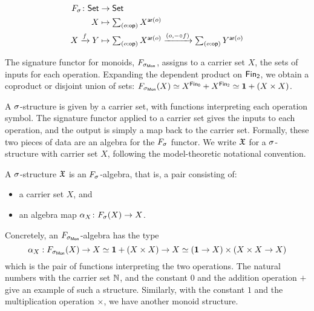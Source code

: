 \begin{definition}
    \label{def:signature-functor}
    \begin{align*}
        \Sig \colon \Set & \to \Set                         \\
        X                & \mapsto \dsum{o:\op}{X^{\ar(o)}} \\
        X \xto{f} Y      & \mapsto
        \dsum{o:\op}{X^{\ar(o)}}
        \xto{(o, \blank \comp f)}
        \dsum{o:\op}{Y^{\ar(o)}}
    \end{align*}
\end{definition}

\begin{example}
    The signature functor for monoids, $\SigMon$, assigns to a carrier set $X$,
    the sets of inputs for each operation.
    Expanding the dependent product on $\Fin[2]$, we obtain a coproduct or disjoint union of sets:
    $\SigMon(X) \eqv X^{\Fin[0]} + X^{\Fin[2]} \eqv \unitt + (X \times X)$.
\end{example}

A $\sigma$-structure is given by a carrier set, with functions interpreting each operation symbol.
%
The signature functor applied to a carrier set gives the inputs to each operation, and the output is simply a map back
to the carrier set.
%
Formally, these two pieces of data are an algebra for the $\Sig$ functor.
%
We write $\mathfrak{X}$ for a $\sigma$-structure with carrier set $X$, following the model-theoretic notational convention.

\begin{definition}[Structure]\label{algebra:struct}
    A $\sigma$-structure $\mathfrak{X}$ is an $\Sig$-algebra, that is, a pair consisting of:
    \begin{itemize}
        \item a carrier set $X$, and
        \item an algebra map $\alpha_{X}\colon \Sig(X) \to X$.
    \end{itemize}
\end{definition}

\begin{example}
    Concretely, an $\SigMon$-algebra has the type
    \[
        \alpha_{X} : \SigMon(X) \to X \eqv \unitt + (X \times X) \to X \eqv (\unitt \to X) \times (X \times X \to X)
    \]
    which is the pair of functions interpreting the two operations.
    The natural numbers with the carrier set $\mathbb{N}$,
    and the constant $0$ and the addition operation $+$ give an example of such a structure.
    Similarly, with the constant $1$ and the multiplication operation $\times$, we have another monoid structure.
\end{example}

